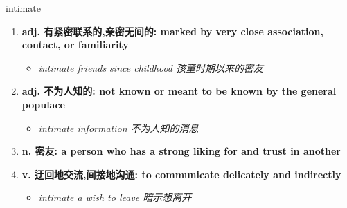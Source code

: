 
\begin{frame}
{\huge intimate}
\begin{center}
\begin{enumerate}\Large
  \item \textbf{adj. 有紧密联系的,亲密无间的: marked by very close association, contact, or familiarity}
  \begin{itemize}
    \item \em{\Large{intimate friends since childhood 孩童时期以来的密友}}
  \end{itemize}
  \item \textbf{adj. 不为人知的: not known or meant to be known by the general populace}
  \begin{itemize}
    \item \em{\Large{intimate information 不为人知的消息}}
  \end{itemize}
  \item \textbf{n. 密友: a person who has a strong liking for and trust in another}
  \item \textbf{v. 迂回地交流,间接地沟通: to communicate delicately and indirectly}
  \begin{itemize}
    \item \em{\Large{intimate a wish to leave 暗示想离开}}
  \end{itemize}
\end{enumerate}
\end{center}
\end{frame}
